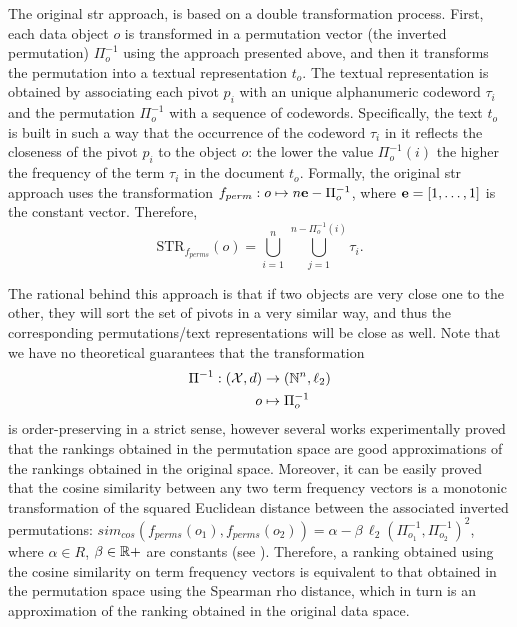 The original \gls{str} approach, \cite{gennaro2010approach} is based on a double transformation process.
First, each data object $o$ is transformed in a permutation vector (the inverted permutation) $\Pi^{-1}_{o}$ using the approach presented above, and then it transforms the permutation into a textual representation $t_o$.
The textual representation is obtained by associating each pivot $p_i$ with an unique alphanumeric codeword $\tau_i$ and the permutation $\Pi^{-1}_{o}$ with a sequence of codewords.
Specifically, the text $t_o$ is built in such a way that the occurrence of the codeword $\tau_i$ in it reflects the closeness of the pivot $p_i$ to the object $o$: the lower the value $\Pi^{-1}_{o}(i)$ the higher the frequency of the term $\tau_i$ in the document $t_o$.
Formally, the original \gls{str} approach uses the transformation
$
f_{perm} : o \mapsto n\e - \Pi^{-1}_{o} %
$,
where $\mathbf{e}=[1,\dots, 1]$ is the constant vector.
Therefore,
\begin{equation}
\text{STR}_{f_{perms}}(o)=\bigcup_{i=1}^n\,\bigcup_{j=1}^{n-\Pi^{-1}_{o}(i)} \tau_i.
\end{equation}

The rational behind this approach is that if two objects are very close one to the other, they will sort the set of pivots in a very similar way, and thus the corresponding permutations/text representations will be close as well.
Note that we have no theoretical guarantees that the transformation
\begin{align}
\Pi^{-1} : (\mathcal{X},d) &\to (\mathbb{N}^n, \ell_2)\\
o &\mapsto \Pi^{-1}_{o}
\end{align}
is order-preserving in a strict sense, however several works \cite{amato2014mi,gonzalez2008effective,esuli2009mipai} experimentally proved that the rankings obtained in the permutation space are good approximations of the rankings obtained in the original space.
Moreover, it can be easily proved that the cosine similarity between any two term frequency vectors is a monotonic transformation of the squared Euclidean distance between the associated inverted permutations: $sim_{cos}(f_{perms}(o_1), f_{perms}(o_2))=\alpha - \beta\,\ell_2(\Pi^{-1}_{o_1},\Pi^{-1}_{o_2})^2 $, where $\alpha \in R{}$, $\beta \in \mathbb{R}+$ are constants (see \cite{vadicamo2016using,vadicamo2018enhancing}).
Therefore, a ranking obtained using the cosine similarity on term frequency vectors is equivalent to that obtained in the permutation space using the Spearman rho distance, which in turn is an approximation of the ranking obtained in the original data space.

